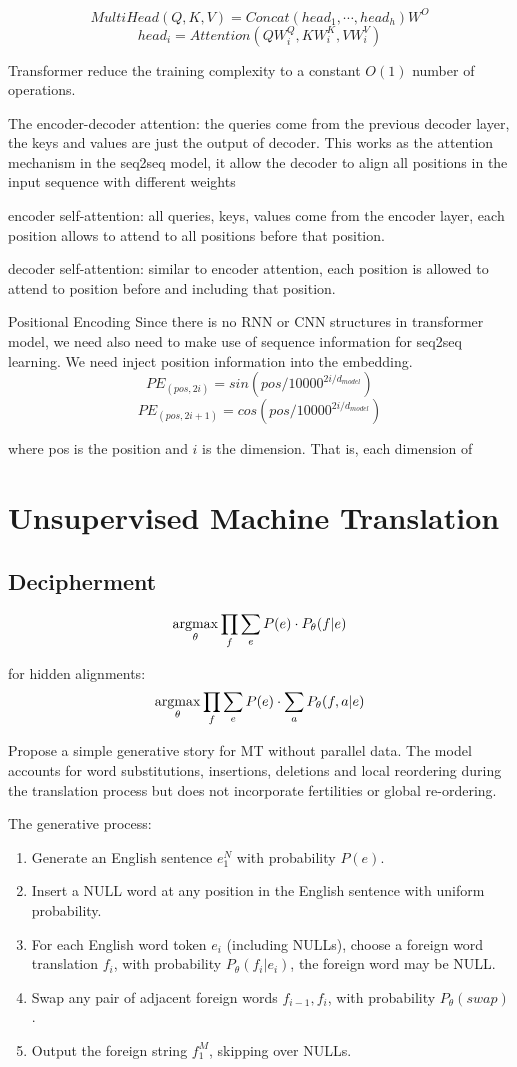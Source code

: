 \[ MultiHead(Q, K, V) = Concat(head_1, \cdots, head_h)W^O \]
\[head_i = Attention(QW_i^Q, KW_i^K, VW_i^V) \]


Transformer reduce the training complexity to a constant ${O(1)}$ number of operations.



The encoder-decoder attention: the queries come from the previous decoder layer, the keys and values are just the output of decoder. This works as the attention mechanism in the seq2seq model, it allow the decoder to align all positions in the input sequence with different weights

encoder self-attention: all queries, keys, values come from the encoder layer, each position allows to attend to all positions before that position.

decoder self-attention: similar to encoder attention, each position is allowed to attend to position before and including that position.


Positional Encoding
Since there is no RNN or CNN structures in transformer model, we need also need to make use of sequence information for seq2seq learning. We need inject position information into the embedding.
\[PE_{(pos, 2i)} = sin(pos/ 10000 ^{2i / d_{model}})\]
\[ PE_{(pos, 2i+1)} = cos(pos / 10000^{2i/d_{model}})\]


where pos is the position and $i$ is the dimension. That is, each dimension of 

\section{Unsupervised Machine Translation}


\subsection{Decipherment}

\[ \underset{\theta}{\operatorname{argmax}} \prod_{f} \sum_{e} P(e) \cdot P_{\theta}(f|e)\]

for hidden alignments: \[ \underset{\theta}{\operatorname{argmax}} \prod_{f} \sum_{e} P(e) \cdot \sum_{a} P_{\theta}(f,a|e) \]


Propose a simple generative story for MT without parallel data. The model accounts for word substitutions, insertions, deletions and local reordering during the translation process but does not incorporate fertilities or global re-ordering.

The generative process:
\begin{enumerate}
	\item Generate an English sentence $e_1^N$ with probability $P(e)$.
	\item Insert a NULL word at any position in the English sentence with uniform probability.
	\item For each English word token $e_i$ (including NULLs), choose a foreign word translation $f_i$, with probability $P_{\theta}(f_i| e_i)$, the foreign word may be NULL.
	\item Swap any pair of adjacent foreign words $f_{i-1}, f_i$, with probability ${P_{\theta}(swap)}$. 
	\item Output the foreign string $f_1^M$, skipping over NULLs.
\end{enumerate}

